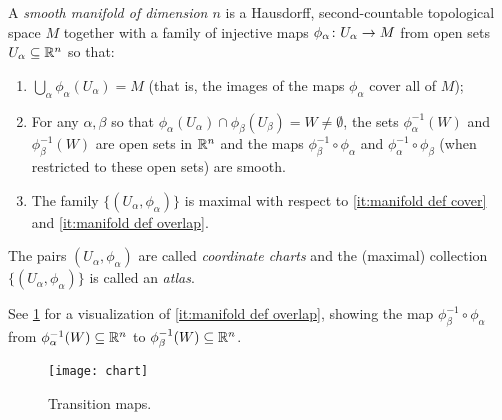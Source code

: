 \begin{definition}\label{def:manifold}
	A \emph{smooth manifold of dimension $n$} is a Hausdorff, second-countable topological space $M$ together with a family of injective maps $\phi_\alpha\colon\thinspace\! U_\alpha \to M$ from open sets $U_\alpha \subseteq \mathbb{R}^n$ so that:
	\begin{enumerate}
		\item \label{it:manifold def cover}$\bigcup_\alpha \phi_\alpha(U_\alpha) = M$ (that is, the images of the maps $\phi_\alpha$ cover all of $M$);
		\item \label{it:manifold def overlap}For any $\alpha, \beta$ so that $\phi_\alpha(U_\alpha) \cap \phi_\beta(U_\beta) = W \neq \emptyset$, the sets $\phi_\alpha^{-1}(W)$ and $\phi_\beta^{-1}(W)$ are open sets in $\mathbb{R}^n$ and the maps $\phi_\beta^{-1} \circ \phi_\alpha$ and $\phi_\alpha^{-1} \circ \phi_\beta$ (when restricted to these open sets) are smooth.
		\item \label{it:manifold def maximal}The family $\{(U_\alpha, \phi_\alpha)\}$ is maximal with respect to \ref{it:manifold def cover} and \ref{it:manifold def overlap}.
	\end{enumerate}
	The pairs $(U_\alpha, \phi_\alpha)$ are called \emph{coordinate charts} and the (maximal) collection $\{(U_\alpha, \phi_\alpha)\}$ is called an \emph{atlas}.	
\end{definition}

See \cref{fig:chart} for a visualization of \ref{it:manifold def overlap}, showing the map $\phi_\beta^{-1} \circ \phi_\alpha$ from $\phi_\alpha^{-1}(W) \subseteq \mathbb{R}^n$ to $\phi_\beta^{-1}(W) \subseteq \mathbb{R}^n$.

\begin{figure}[htbp]
	\centering
		\texttt{[image: chart]}
	\caption{Transition maps.}
	\label{fig:chart}
\end{figure}

